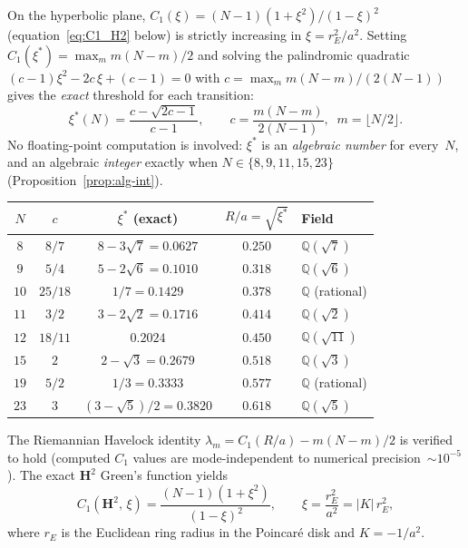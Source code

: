 \noindent
On the hyperbolic plane, $C_1(\xi) = (N{-}1)(1{+}\xi^2)/(1{-}\xi)^2$
(equation~\eqref{eq:C1_H2} below) is strictly increasing in
$\xi = r_E^2/a^2$.  Setting $C_1(\xi^*) = \max_m m(N{-}m)/2$ and
solving the palindromic quadratic
$(c{-}1)\xi^2 - 2c\,\xi + (c{-}1) = 0$
with $c = \max_m m(N{-}m)/(2(N{-}1))$
gives the \emph{exact} threshold for each transition:
\begin{equation}\label{eq:xi-star-exact}
  \xi^*(N) = \frac{c - \sqrt{2c{-}1}}{c - 1},
  \qquad c = \frac{m(N{-}m)}{2(N{-}1)},\;\; m = \lfloor N/2\rfloor.
\end{equation}
No floating-point computation is involved: $\xi^*$ is an
\emph{algebraic number} for every~$N$, and an algebraic
\emph{integer} exactly when $N \in \{8, 9, 11, 15, 23\}$
(Proposition~\ref{prop:alg-int}).
\begin{center}
\begin{tabular}{ccccl}
\toprule
$N$ & $c$ & $\xi^*$ (exact) & $R/a = \sqrt{\xi^*}$ & Field \\
\midrule
$8$  & $8/7$  & $8{-}3\sqrt{7} = 0.0627$ & $0.250$ &
  $\mathbb{Q}(\sqrt{7})$ \\
$9$  & $5/4$  & $5{-}2\sqrt{6} = 0.1010$ & $0.318$ &
  $\mathbb{Q}(\sqrt{6})$ \\
$10$ & $25/18$ & $1/7 = 0.1429$ & $0.378$ &
  $\mathbb{Q}$ (rational) \\
$11$ & $3/2$  & $3{-}2\sqrt{2} = 0.1716$ & $0.414$ &
  $\mathbb{Q}(\sqrt{2})$ \\
$12$ & $18/11$ & $0.2024$ & $0.450$ &
  $\mathbb{Q}(\sqrt{11})$ \\
$15$ & $2$    & $2{-}\sqrt{3} = 0.2679$ & $0.518$ &
  $\mathbb{Q}(\sqrt{3})$ \\
$19$ & $5/2$  & $1/3 = 0.3333$ & $0.577$ &
  $\mathbb{Q}$ (rational) \\
$23$ & $3$    & $(3{-}\sqrt{5})/2 = 0.3820$ & $0.618$ &
  $\mathbb{Q}(\sqrt{5})$ \\
\bottomrule
\end{tabular}
\end{center}
The Riemannian Havelock identity $\lambda_m = C_1(R/a) - m(N{-}m)/2$
is verified to hold (computed $C_1$ values are mode-independent to
numerical precision~$\sim 10^{-5}$).  The exact $\mathbf{H}^2$
Green's function yields
\begin{equation}
  C_1(\mathbf{H}^2,\,\xi)
    = \frac{(N-1)(1+\xi^2)}{(1-\xi)^2},
  \qquad \xi = \frac{r_E^2}{a^2} = |K|\,r_E^2 ,
  \label{eq:C1_H2}
\end{equation}
where $r_E$ is the Euclidean ring radius in the Poincar\'e disk and
$K = -1/a^2$.

